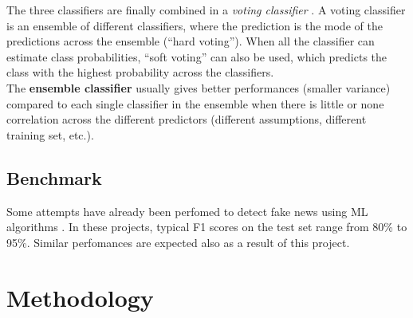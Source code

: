 \documentclass[a4paper,12pt]{article} %
\begin{document}
The three classifiers are finally combined in a \textit{voting classifier} \cite{scikit-ensemble}.
A voting classifier is an ensemble of different classifiers, where the
prediction is the mode of the predictions across the ensemble (``hard voting'').
When all the classifier can estimate class probabilities, ``soft voting'' can also be used,
which predicts the class with the highest probability across the classifiers. \\
The \textbf{ensemble classifier} usually gives better performances (smaller variance) compared to each single classifier in the
ensemble when there is little or none correlation across the different predictors
(different assumptions, different training set, etc.).

\subsection{Benchmark}
\label{sec:benchmark}
Some attempts have already been perfomed to detect fake news using ML algorithms \cite{Genes, NYDSA, jarmul}.
In these projects, typical F1 scores on the test set range from 80\% to 95\%.
Similar perfomances are expected also as a result of this project.


\section{Methodology}
\end{document}
